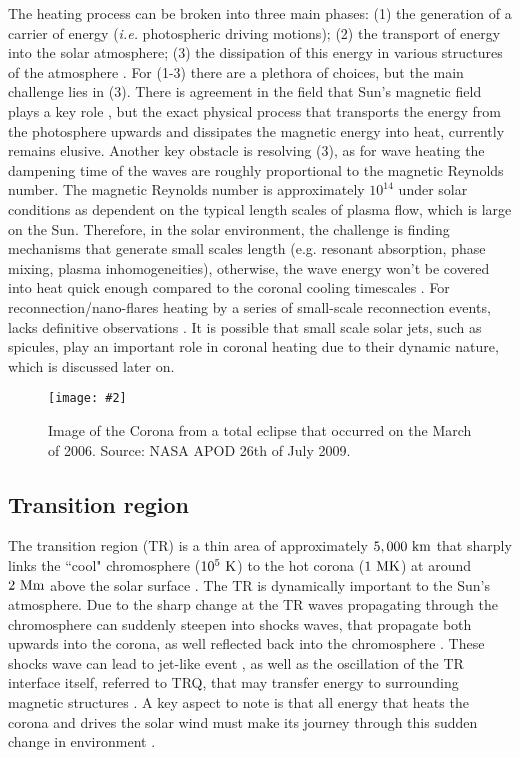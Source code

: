 \documentclass[12pt]{ociamthesis}
\newcommand{\mfig}[4]{
  \begin{figure}
  \begin{center}
  \texttt{[image: \#2]}
  \caption{#3}
  \label{#4}
  \end{center}
  \end{figure}}
\begin{document}
%
The heating process can be broken into three main phases: (1) the generation of a carrier of energy (\textit{i.e.} photospheric driving motions); (2) the transport of energy into the solar atmosphere; (3) the dissipation of this energy in various structures of the atmosphere \citep{Wentzel1974SoPh39129W, Robert2004AG45d34E}. For (1-3) there are a plethora of choices, but the main challenge lies in (3). There is agreement in the field that Sun's magnetic field plays a key role \citep{Parnell2012RSPTA3703217P, Arregui2015RSPTA37340261A}, but the exact physical process that transports the energy from the photosphere upwards and dissipates the magnetic energy into heat, currently remains elusive. Another key obstacle is resolving (3), as for wave heating the dampening time of the waves are roughly proportional to the magnetic Reynolds number. The magnetic Reynolds number is approximately  $10^{14}$ under solar conditions as dependent on the typical length scales of plasma flow, which is large on the Sun. Therefore, in the solar environment, the challenge is finding mechanisms that generate small scales length (e.g. resonant absorption, phase mixing, plasma inhomogeneities), otherwise, the wave energy won't be covered into heat quick enough compared to the coronal cooling timescales \citep{Doorsselaere2020SSRv216140V}. For reconnection/nano-flares heating by a series of small-scale reconnection events, lacks definitive observations \citep{Parnell2012RSPTA3703217P}. It is possible that small scale solar jets, such as spicules, play an important role in coronal heating due to their dynamic nature, which is discussed later on.
\mfig{0.65}{figures/corona_vangorp.png}{Image of the Corona from a total eclipse that occurred on the March of 2006. Source: NASA APOD 26th of July 2009.}{corona_image}
\subsection{Transition region}
\label{ssec:TR}
The transition region (TR) is a thin area of approximately $5,000~\rm{km}$ \citep{Athay1981NASSP45085A} that sharply links the ``cool" chromosphere ($10^{5}~\rm{K}$) to the hot corona ($1~\rm{MK}$) at around $2~\rm{Mm}$ above the solar surface \citep{Lang_2006ses}. The TR is dynamically important to the Sun's atmosphere. Due to the sharp change at the TR waves propagating through the chromosphere can suddenly steepen into shocks waves, that propagate both upwards into the corona, as well reflected back into the chromosphere \citep{Pontieu2005ApJ624L61D, Hansteen2007ASPC369193H, Yuan_2016ApJS, Zhenyong2018ApJ85565H}. These shocks wave can lead to jet-like event \citep{Heggland2007ApJ6661277H, kuz2017ApJ, Pontieu2005ApJ624L61D, De_Pontieu2007ApJ}, as well as the oscillation of the TR interface itself, referred to TRQ, that may transfer energy to surrounding magnetic structures \citep{Scullion2011}. A key aspect to note is that all energy that heats the corona and drives the solar wind must make its journey through this sudden change in environment \citep{Mariska1992strbookM}. 
\end{document}
